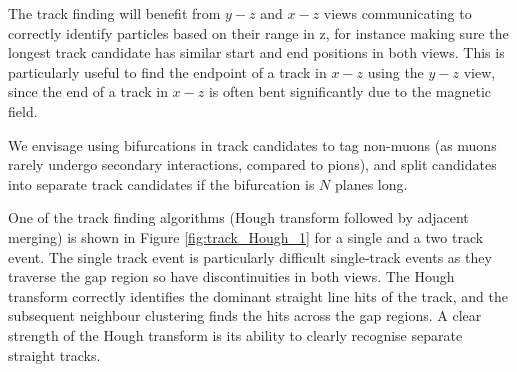 The track finding will benefit from $y-z$ and $x-z$ views communicating to correctly identify particles based on their range in z, for instance making sure the longest track candidate has similar start and end positions in both views. This is particularly useful to find the endpoint of a track in $x-z$ using the $y-z$ view, since the end of a track in $x-z$ is often bent significantly due to the magnetic field. 

We envisage using bifurcations in track candidates to tag non-muons (as muons rarely undergo secondary interactions, compared to pions), and split candidates into separate track candidates if the bifurcation is $N$ planes long.

One of the track finding algorithms (Hough transform followed by adjacent merging) is shown in Figure \ref{fig:track_Hough_1} for a single and a two track event. The single track event is particularly difficult single-track events as they traverse the gap region so have discontinuities in both views. The Hough transform correctly identifies the dominant straight line hits of the track, and the subsequent neighbour clustering finds the hits across the gap regions. A clear strength of the Hough transform is its ability to clearly recognise separate straight tracks.
